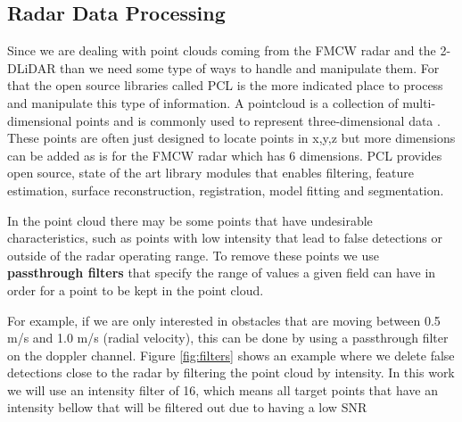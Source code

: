 \subsection{Radar Data Processing}
Since we are dealing with point clouds coming from the \ac{FMCW} \ac{radar} and the 2-D\ac{LiDAR} than we need some type of ways to handle and manipulate them. For that the open source libraries called \ac{PCL} is the more indicated place to process and manipulate this type of information. A pointcloud is a collection of multi-dimensional points and is commonly used to represent three-dimensional data \cite{pcl}. These points are often just designed to locate points in x,y,z but more dimensions can be added as is for the FMCW radar which has 6 dimensions. \ac{PCL} provides open source, state of the art library modules that enables  filtering, feature estimation, surface reconstruction, registration, model fitting and segmentation. 

In the point cloud there may be some points that have undesirable characteristics, such as points with low intensity  that lead to false detections or outside of the radar operating range. To remove these points we use \textbf{passthrough filters} that specify the range of values a given field can have in order for a point to be kept in the point cloud. 

For example, if we are only interested in obstacles that are moving between 0.5 m/s and 1.0 m/s (radial velocity), this can be done by using a passthrough filter on the doppler channel.
Figure \ref{fig:filters} shows an example where we delete false detections close to the radar by filtering the point cloud by intensity. In this work we will use an intensity filter of 16, which means all target points that have an intensity bellow that will be filtered out due to having a low \ac{SNR}


